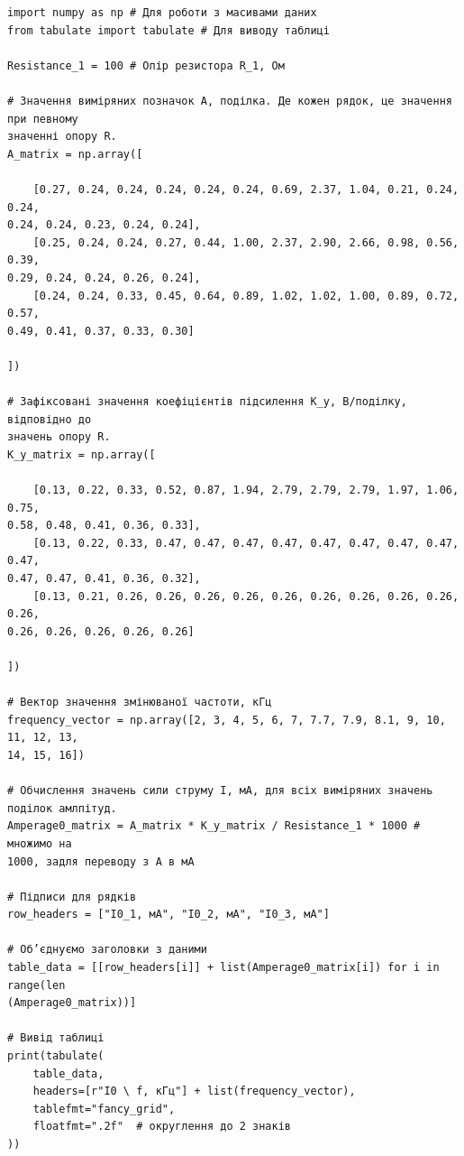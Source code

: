 \documentclass[12pt, a4paper]{article}
\begin{document}
    \small{ 

    \begin{verbatim}
import numpy as np # Для роботи з масивами даних
from tabulate import tabulate # Для виводу таблиці

Resistance_1 = 100 # Опір резистора R_1, Ом

# Значення виміряних позначок A, поділка. Де кожен рядок, це значення при певному
значенні опору R.
A_matrix = np.array([

    [0.27, 0.24, 0.24, 0.24, 0.24, 0.24, 0.69, 2.37, 1.04, 0.21, 0.24, 0.24,
0.24, 0.24, 0.23, 0.24, 0.24],
    [0.25, 0.24, 0.24, 0.27, 0.44, 1.00, 2.37, 2.90, 2.66, 0.98, 0.56, 0.39,
0.29, 0.24, 0.24, 0.26, 0.24],
    [0.24, 0.24, 0.33, 0.45, 0.64, 0.89, 1.02, 1.02, 1.00, 0.89, 0.72, 0.57,
0.49, 0.41, 0.37, 0.33, 0.30]

])

# Зафіксовані значення коефіцієнтів підсилення K_y, В/поділку, відповідно до
значень опору R.
K_y_matrix = np.array([

    [0.13, 0.22, 0.33, 0.52, 0.87, 1.94, 2.79, 2.79, 2.79, 1.97, 1.06, 0.75,
0.58, 0.48, 0.41, 0.36, 0.33],
    [0.13, 0.22, 0.33, 0.47, 0.47, 0.47, 0.47, 0.47, 0.47, 0.47, 0.47, 0.47,
0.47, 0.47, 0.41, 0.36, 0.32],
    [0.13, 0.21, 0.26, 0.26, 0.26, 0.26, 0.26, 0.26, 0.26, 0.26, 0.26, 0.26,
0.26, 0.26, 0.26, 0.26, 0.26]

])

# Вектор значення змінюваної частоти, кГц
frequency_vector = np.array([2, 3, 4, 5, 6, 7, 7.7, 7.9, 8.1, 9, 10, 11, 12, 13,
14, 15, 16])

# Обчислення значень сили струму I, мА, для всіх виміряних значень поділок амлпітуд.
Amperage0_matrix = A_matrix * K_y_matrix / Resistance_1 * 1000 # множимо на
1000, задля переводу з А в мА

# Підписи для рядків
row_headers = ["I0_1, мА", "I0_2, мА", "I0_3, мА"]

# Об’єднуємо заголовки з даними
table_data = [[row_headers[i]] + list(Amperage0_matrix[i]) for i in range(len
(Amperage0_matrix))]

# Вивід таблиці
print(tabulate(
    table_data,
    headers=[r"I0 \ f, кГц"] + list(frequency_vector),
    tablefmt="fancy_grid",
    floatfmt=".2f"  # округлення до 2 знаків
))
\end{verbatim}
}

    \vspace{3em}

    \hypertarget{listing2}{}
\end{document}
